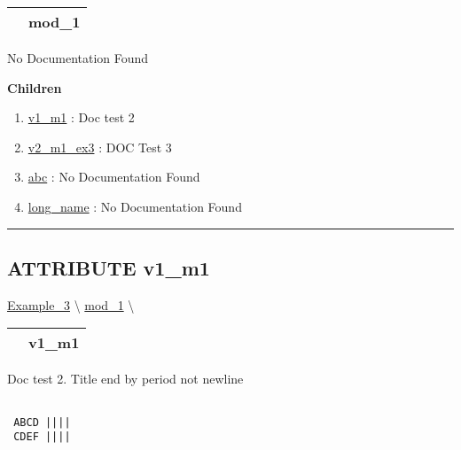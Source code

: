 {\renewcommand{\arraystretch}{1.5}
\begin{tabularx}{\textwidth}{|>{\raggedright\arraybackslash}l|X|}
\hline
\hspace{0pt}\mytexttt{\color{red} } & \textbf{mod\_1} \\
\hline
\end{tabularx}
}

\par





No Documentation Found







\textbf{Children}
\begin{enumerate}
\item \hyperlink{ecldoc:example_3.mod_1.v1_m1}{v1\_m1}
: Doc test 2
\item \hyperlink{ecldoc:example_3.mod_1.v2_m1_ex3}{v2\_m1\_ex3}
: DOC Test 3
\item \hyperlink{ecldoc:example_3.mod_1.abc}{abc}
: No Documentation Found
\item \hyperlink{ecldoc:example_3.mod_1.long_name}{long\_name}
: No Documentation Found
\end{enumerate}

\rule{\linewidth}{0.5pt}

\subsection*{\textsf{\colorbox{headtoc}{\color{white} ATTRIBUTE}
v1\_m1}}

\hypertarget{ecldoc:example_3.mod_1.v1_m1}{}
\hspace{0pt} \hyperlink{ecldoc:Example_3}{Example_3} \textbackslash 
\hspace{0pt} \hyperlink{ecldoc:Example_3.mod_1}{mod_1} \textbackslash 

{\renewcommand{\arraystretch}{1.5}
\begin{tabularx}{\textwidth}{|>{\raggedright\arraybackslash}l|X|}
\hline
\hspace{0pt}\mytexttt{\color{red} } & \textbf{v1\_m1} \\
\hline
\end{tabularx}
}

\par





Doc test 2. Title end by period not newline 
\begin{verbatim}

 ABCD ||||
 CDEF ||||\end{verbatim}










